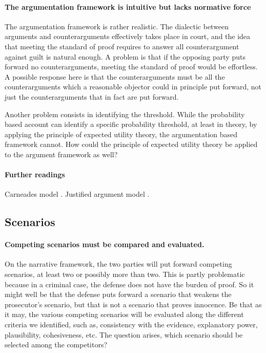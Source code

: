 \documentclass[10pt]{article}
\begin{document}
\paragraph{The argumentation framework is intuitive but lacks normative force}


The argumentation framework is rather realistic. The dialectic between arguments and 
counterarguments effectively takes place in court, and the idea that meeting the standard of proof requires to answer all 
counterargument against guilt is natural enough. A problem is that if the opposing party puts forward no counterarguments, meeting the standard of proof would be effortless. A possible response here is that the counterarguments must be all the counterarguments which a reasonable objector could in principle put forward, not just 
the counterarguments that in fact are put forward. %

Another problem consists in identifying the threshold. While the probability based account can identify a specific probability threshold, 
at least in theory, by applying the principle of expected utility theory, the argumentation based framework cannot. 
How could the principle of expected utility theory be applied to the argument framework as well?



\paragraph{Further readings}
Carneades model \citep{gordonEtal2007, gordon2009}.
Justified argument model \citep{prakkenSartor2007, prakken2009}.



\subsection{Scenarios}


\paragraph{Competing scenarios must be compared and evaluated.}

On the narrative framework, the two parties will put forward competing scenarios, at least two or possibly more than two. This is partly problematic because in a criminal case, the defense does not have the burden of proof. So it might well be that the defense puts forward a scenario that weakens the prosecutor's scenario, but that is not 
a scenario that proves innocence. Be that as it may, the various competing scenarios will be evaluated along the different criteria we identified, such as, consistency with the evidence, explanatory power, plausibility, cohesiveness, etc. The question arises, which scenario should be selected among the competitors?
\end{document}
